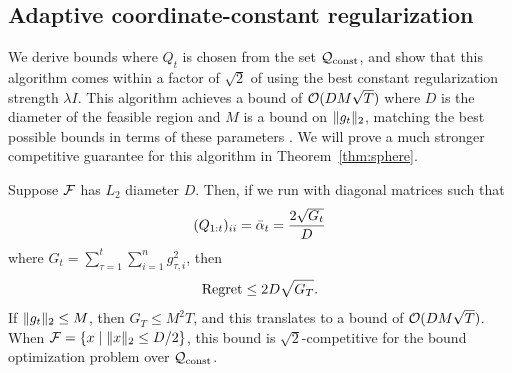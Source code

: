 \subsection {Adaptive coordinate-constant regularization}
\label{sec:global_reg}
We derive bounds where $Q_t$ is chosen from the set $\mathcal{Q}_{\text{const}}$, and
show that this algorithm comes within a factor of $\sqrt{2}$ of using
the best constant regularization strength $\lambda I$.  This algorithm
achieves a bound of $\mathcal{O}(DM\sqrt{T})$ where $D$ is the diameter of
the feasible region and $M$ is a bound on $\| g_t \|_2$, matching the
best possible bounds in terms of these parameters \cite{abernethy08}. 
We will prove a much stronger competitive guarantee for this algorithm
in Theorem~\ref{thm:sphere}.



\begin{corollary}\label{cor:global}
Suppose $\mathcal{F}$ has $L_2$ diameter $D$.  Then, if we run \FTPRL with
diagonal matrices such that
\[ (Q_{1:t})_{ii} = \bar{\alpha}_t = \frac{2\sqrt{G_t}}{D}\]
 where $G_t = \sum_{\tau=1}^t \sum_{i=1}^n g_{\tau,i}^2$, then
\[ \text{Regret} \leq  2 D \sqrt{G_T}.\]
If $\| g_t \|_2 \leq M$, then $G_T \leq M^2 T$, and this translates
to a bound of $\mathcal{O}(DM\sqrt{T})$.  When $\mathcal{F} = \left\{x \mid \| x \|_2
\leq D/2\right\}$, this bound is $\sqrt{2}$-competitive for the bound
optimization problem over $\mathcal{Q}_{\text{const}}$.
\end{corollary}

